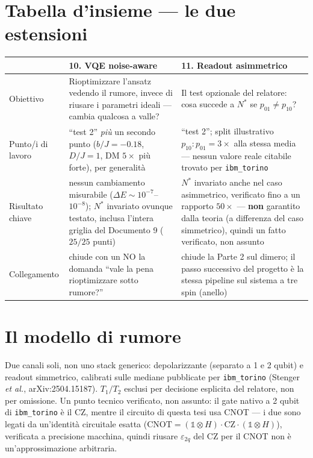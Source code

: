\documentclass[11pt,a4paper]{article}
\begin{document}
\clearpage

\section{Tabella d'insieme --- le due estensioni}

\renewcommand{\arraystretch}{1.35}
\begin{center}
\small
\setlength{\tabcolsep}{5pt}
\begin{tabular}{@{}>{\bfseries\raggedright}p{2.6cm} p{5.6cm} p{5.6cm}@{}}
\toprule
\rowcolor{grigetto}
 & \textbf{10. VQE noise-aware} & \textbf{11. Readout asimmetrico} \\
\midrule
Obiettivo &
Rioptimizzare l'ansatz vedendo il rumore, invece di riusare i parametri
ideali --- cambia qualcosa a valle? &
Il test opzionale del relatore: cosa succede a $N^*$ se $p_{01}\neq p_{10}$? \\
\addlinespace
Punto/i di lavoro &
``test 2'' \emph{più} un secondo punto ($b/J{=}{-}0.18$, $D/J{=}1$, DM
$5\times$ più forte), per generalità &
``test 2''; split illustrativo $p_{10}{:}p_{01}=3\times$ alla stessa
media --- nessun valore reale citabile trovato per \texttt{ibm\_torino} \\
\addlinespace
Risultato chiave &
nessun cambiamento misurabile ($\Delta E\sim10^{-7}$--$10^{-8}$); $N^*$
invariato ovunque testato, inclusa l'intera griglia del Documento 9
($25/25$ punti) &
$N^*$ invariato anche nel caso asimmetrico, verificato fino a un rapporto
$50\times$ --- \textbf{non} garantito dalla teoria (a differenza del caso
simmetrico), quindi un fatto verificato, non assunto \\
\addlinespace
Collegamento &
chiude con un NO la domanda ``vale la pena rioptimizzare sotto rumore?'' &
chiude la Parte 2 sul dimero; il passo successivo del progetto è la
stessa pipeline sul sistema a tre spin (anello) \\
\bottomrule
\end{tabular}
\end{center}

\section{Il modello di rumore}

Due canali soli, non uno stack generico: depolarizzante (separato a 1 e 2
qubit) e readout simmetrico, calibrati sulle mediane pubblicate per
\texttt{ibm\_torino} (Stenger \emph{et al.}, arXiv:2504.15187). $T_1/T_2$
esclusi per decisione esplicita del relatore, non per omissione. Un punto
tecnico verificato, non assunto: il gate nativo a 2 qubit di
\texttt{ibm\_torino} è il CZ, mentre il circuito di questa tesi usa CNOT
--- i due sono legati da un'identità circuitale esatta
($\text{CNOT}=(\mathbb1\otimes H)\cdot\text{CZ}\cdot(\mathbb1\otimes H)$),
verificata a precisione macchina, quindi riusare $\varepsilon_{2q}$ del CZ
per il CNOT non è un'approssimazione arbitraria.
\end{document}
